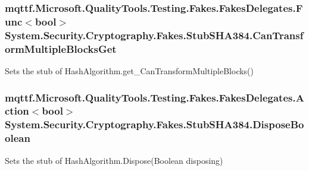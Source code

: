 \hypertarget{class_system_1_1_security_1_1_cryptography_1_1_fakes_1_1_stub_s_h_a384_a0b35c21a704381b94a68d8044783b79d}{
\subsubsection[{Can\-Transform\-Multiple\-Blocks\-Get}]{\setlength{\rightskip}{0pt plus 5cm}mqttf.\-Microsoft.\-Quality\-Tools.\-Testing.\-Fakes.\-Fakes\-Delegates.\-Func$<$bool$>$ System.\-Security.\-Cryptography.\-Fakes.\-Stub\-S\-H\-A384.\-Can\-Transform\-Multiple\-Blocks\-Get}}\label{class_system_1_1_security_1_1_cryptography_1_1_fakes_1_1_stub_s_h_a384_a0b35c21a704381b94a68d8044783b79d}


Sets the stub of Hash\-Algorithm.\-get\-\_\-\-Can\-Transform\-Multiple\-Blocks()

\hypertarget{class_system_1_1_security_1_1_cryptography_1_1_fakes_1_1_stub_s_h_a384_a18e5ebbef0d17f0dbab3a50c9c4be7d0}{
\subsubsection[{Dispose\-Boolean}]{\setlength{\rightskip}{0pt plus 5cm}mqttf.\-Microsoft.\-Quality\-Tools.\-Testing.\-Fakes.\-Fakes\-Delegates.\-Action$<$bool$>$ System.\-Security.\-Cryptography.\-Fakes.\-Stub\-S\-H\-A384.\-Dispose\-Boolean}}\label{class_system_1_1_security_1_1_cryptography_1_1_fakes_1_1_stub_s_h_a384_a18e5ebbef0d17f0dbab3a50c9c4be7d0}


Sets the stub of Hash\-Algorithm.\-Dispose(\-Boolean disposing)

